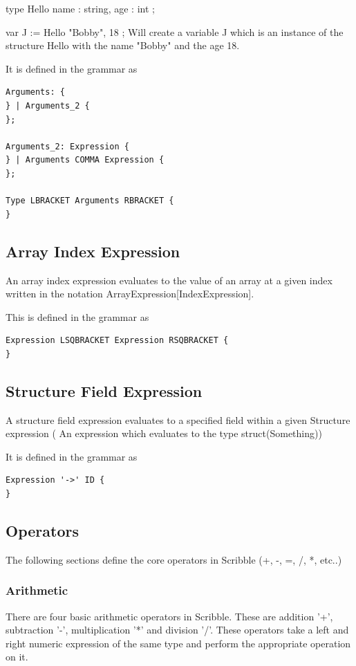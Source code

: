 \documentclass[]{final_report}
\begin{document}
type Hello { 
	name : string,
	age : int
};

var J := Hello{ "Bobby", 18 };
Will create a variable J which is an instance of the structure Hello with the name "Bobby" and the age 18.

It is defined in the grammar as
\begin{verbatim}
Arguments: {
} | Arguments_2 {
};

Arguments_2: Expression {
} | Arguments COMMA Expression {
};

Type LBRACKET Arguments RBRACKET {
}
\end{verbatim}

\subsection{Array Index Expression}

An array index expression evaluates to the value of an array at a given index written in the notation ArrayExpression[IndexExpression].

This is defined in the grammar as \begin{verbatim}
Expression LSQBRACKET Expression RSQBRACKET {
}
\end{verbatim}

\subsection{Structure Field Expression}

A structure field expression evaluates to a specified field within a given Structure expression ( An expression which evaluates to the type struct(Something))

It is defined in the grammar as
\begin{verbatim}
Expression '->' ID {
}
\end{verbatim}

\subsection{Operators}

The following sections define the core operators in Scribble (+, -, =, /, *, etc..)

\subsubsection{Arithmetic}

There are four basic arithmetic operators in Scribble. These are addition '+', subtraction '-', multiplication '*' and division '/'. These operators take a left and right numeric expression of the same type and perform the appropriate operation on it.
\end{document}
